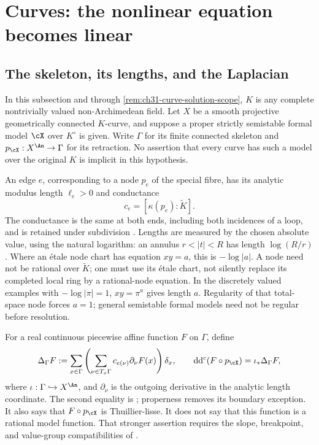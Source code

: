 \section{Curves: the nonlinear equation becomes linear}
\label{sec:ch31-curves}


\subsection{The skeleton, its lengths, and the Laplacian}
\label{sec:ch31-curve-setup}

In this subsection and through \cref{rem:ch31-curve-solution-scope},
\(K\) is any complete nontrivially valued non-Archimedean field.
Let \(X\) be a smooth projective geometrically connected \(K\)-curve,
and suppose a proper strictly semistable formal model \(\cX\) over
\(K^\circ\) is given.  Write \(\Gamma\) for its finite connected
skeleton and \(p_{\cX}:X^{\An}\to\Gamma\) for its retraction.
No assertion that every curve has such a model over the original
\(K\) is implicit in this hypothesis.

An edge \(e\), corresponding to a node \(p_e\) of the special fibre,
has its analytic modulus length \(\ell_e>0\) and conductance
\[
                    c_e=[\kappa(p_e):\widetilde K].
\]
The conductance is the same at both ends, including both incidences
of a loop, and is retained under subdivision
\cite[\S2.2.3, p.~41]{Thu05}.
Lengths are measured by the chosen absolute value, using the natural
logarithm: an annulus \(r<|t|<R\) has length \(\log(R/r)\).
Where an \'{e}tale node chart has equation \(xy=a\), this is
\(-\log|a|\).  A node need not be rational over \(\widetilde K\);
one must use its \'{e}tale chart, not silently replace its completed
local ring by a rational-node equation.  In the discretely valued
examples with \(-\log|\pi|=1\), \(xy=\pi^a\) gives length \(a\).
Regularity of that total-space node forces \(a=1\); general
semistable formal models need not be regular before resolution.

For a real continuous piecewise affine function \(F\) on \(\Gamma\),
define
\begin{equation}
\label{eq:ch31-graph-laplacian}
 \Delta_\Gamma F
   :=\sum_{x\in\Gamma}
       \left(\sum_{\nu\in T_x\Gamma}
              c_{e(\nu)}\partial_\nu F(x)\right)\delta_x,
 \qquad
 \mathrm d\mathrm d^c(F\circ p_{\cX})=\iota_*\Delta_\Gamma F ,
\end{equation}
where \(\iota:\Gamma\hookrightarrow X^{\An}\), and
\(\partial_\nu\) is the outgoing derivative in the analytic length
coordinate.  The second equality is
\cite[Theorem~3.2.10(ii)]{Thu05}; properness removes its boundary
exception.  It also says that \(F\circ p_{\cX}\) is Thuillier-lisse.
It does not say that this function is a rational model function.
That stronger assertion requires the slope, breakpoint, and value-group
compatibilities of \cite[Proposition~3.5]{GJKM19}.

